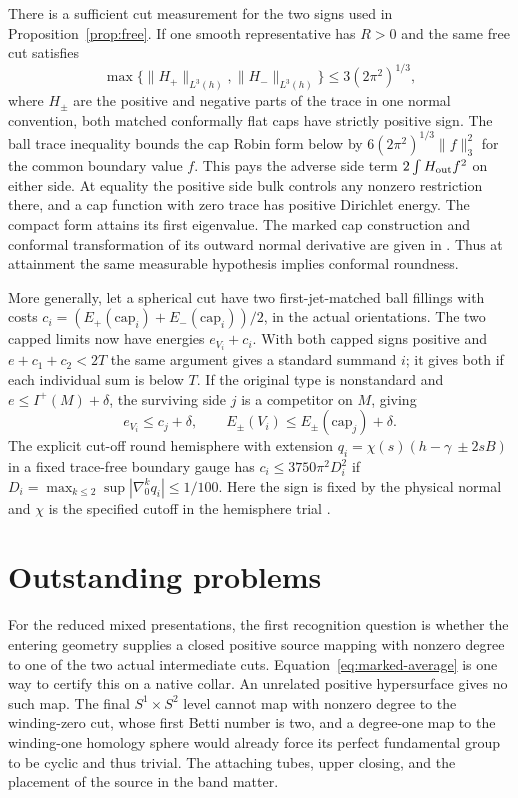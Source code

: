 \documentclass[11pt,letterpaper]{article}
\numberwithin{equation}{section}
\theoremstyle{definition}
\begin{document}
There is a sufficient cut measurement for the two signs used in
Proposition~\ref{prop:free}. If one smooth representative has \(R>0\)
and the same free cut satisfies
\[
 \max\bigl\{\|H_+\|_{L^3(h)},\|H_-\|_{L^3(h)}\bigr\}
 \le 3(2\pi^2)^{1/3},
\]
where \(H_\pm\) are the positive and negative parts of the trace in one
normal convention, both matched conformally flat caps have strictly
positive sign. The ball trace inequality
\cite[Theorem 1.1]{NgoNguyenPhan2020Trace}
bounds the cap Robin form below by \(6(2\pi^2)^{1/3}\|f\|_3^2\)
for the common boundary value \(f\). This pays the adverse side term
\(2\int H_{\rm out} f^2\) on either side. At equality the positive side
bulk controls any nonzero restriction there, and a cap function with
zero trace has positive Dirichlet energy. The compact form attains its
first eigenvalue. The marked cap construction and conformal transformation
of its outward normal derivative are given in \cite{Baker2026ChiralMaster}.
Thus at attainment the same measurable hypothesis implies conformal roundness.

More generally, let a spherical cut have two first-jet-matched ball
fillings with costs \(c_i=(E_+(\mathrm{cap}_i)+E_-(\mathrm{cap}_i))/2\),
in the actual orientations. The two capped limits now have energies
\(e_{V_i}+c_i\). With both capped signs positive and
\(e+c_1+c_2<2T\) the same argument gives a standard summand \(i\);
it gives both if each individual sum is below \(T\). If the original
type is nonstandard and \(e\le I^+(M)+\delta\), the surviving side
\(j\) is a competitor on \(M\), giving
\[
 e_{V_i}\le c_j+\delta,\qquad
 E_\pm(V_i)\le E_\pm(\mathrm{cap}_j)+\delta.
\]
The explicit cut-off round hemisphere with extension
\(q_i=\chi(s)(h-\gamma\ \pm 2s B)\) in a fixed trace-free boundary
gauge has \(c_i\le3750\pi^2 D_i^2\) if
\(D_i=\max_{k\le2}\sup|\nabla_0^k q_i|\le1/100\).
Here the sign is fixed by the physical normal and \(\chi\) is the
specified cutoff in the hemisphere trial
\cite[SEAM, quantitative capped descent]{Baker2026MarkedCutCalculations}.

\section{Outstanding problems}\label{sec:open}

For the reduced mixed presentations, the first recognition question is
whether the entering geometry supplies a closed positive source
mapping with nonzero degree to one of the two actual intermediate
cuts. Equation~\eqref{eq:marked-average} is one way to certify this
on a native collar. An unrelated positive hypersurface gives no such
map. The final \(S^1\times S^2\) level cannot map with nonzero degree
to the winding-zero cut, whose first Betti number is two, and a degree-one
map to the winding-one homology sphere would already force its perfect
fundamental group to be cyclic and thus trivial. The attaching tubes,
upper closing, and the placement of the source in the band matter.
\end{document}
